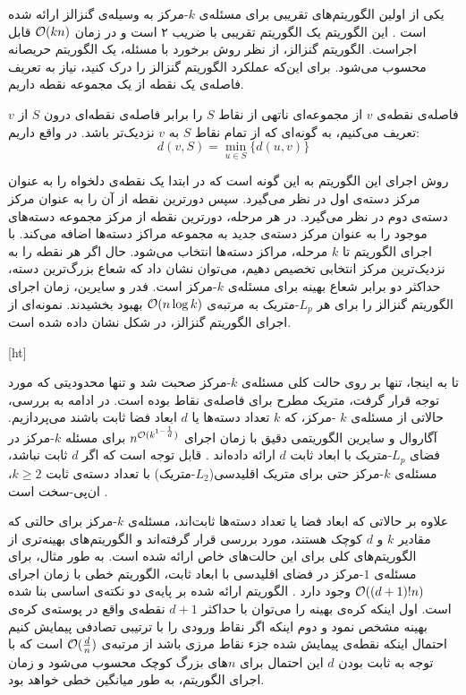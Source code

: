 یکی از اولین الگوریتم‌های تقریبی برای مسئله‌ی $k$-مرکز به وسیله‌ی گنزالز ارائه شده است . این الگوریتم یک الگوریتم تقریبی با ضریب ۲ است و در زمان $\mathcal{O}(kn)$ قابل اجراست. الگوریتم گنزالز، از نظر روش برخورد با مسئله، یک الگوریتم حریصانه محسوب می‌شود. برای این‌که عملکرد الگوریتم گنزالز را درک کنید، نیاز به تعریف فاصله‌ی یک نقطه از یک مجموعه نقطه داریم.

فاصله‌ی نقطه‌ی $v$ از‌ مجموعه‌ای‌ ناتهی از نقاط $S$ را برابر فاصله‌ی نقطه‌ای درون $S$ از $v$ تعریف می‌کنیم، به گونه‌ای که از تمام نقاط $S$ به $v$ نزدیک‌تر باشد. در واقع داریم:
$$d(v, S) = \min_{u \in S} \{ d(u, v) \}$$

 روش اجرای این الگوریتم به این گونه است که در ابتدا یک نقطه‌ی دلخواه را به عنوان مرکز‌ دسته‌ی اول در نظر می‌گیرد. سپس دورترین نقطه‌ از آن را به عنوان مرکز دسته‌ی دوم در نظر می‌گیرد. در هر مرحله، دورترین نقطه از مرکز ‌مجموعه دسته‌های موجود را به عنوان مرکز‌ دسته‌ی جدید به مجموعه مراکز‌ دسته‌ها اضافه می‌کند. با اجرای الگوریتم تا $k$ مرحله، مراکز دسته‌ها انتخاب می‌شود. حال اگر هر نقطه را به نزدیک‌ترین مرکز انتخابی تخصیص دهیم، می‌توان نشان داد که شعاع بزرگ‌ترین دسته، حداکثر دو برابر شعاع بهینه‌ برای مسئله‌ی $k$-مرکز است. فدر و سایرین، زمان اجرای الگوریتم گنزالز را برای هر $L_p$-متریک به مرتبه‌ی $\mathcal{O}(n \log{k})$ بهبود بخشیدند. نمونه‌ای از اجرای الگوریتم گنزالز، در شکل  نشان داده شده است.

[ht]

تا به اینجا، تنها بر روی حالت کلی مسئله‌ی $k$-مرکز صحبت شد و تنها محدودیتی که مورد توجه قرار گرفت، متریک مطرح برای فاصله‌ی نقاط بوده است. در ادامه به بررسی، حالاتی از مسئله‌ی $k$ -مرکز، که $k$ تعداد دسته‌ها یا $d$ ابعاد فضا ثابت باشند می‌پردازیم. آگاروال و سایرین الگوریتمی دقیق با زمان اجرای $n^{\mathcal{O}(k^{1 - \frac{1}{d}})}$ برای مسئله‌ $k$-مرکز در فضای $L_p$-متریک با ابعاد ثابت $d$ ارائه داده‌اند . قابل توجه است که اگر $d$ ثابت نباشد، مسئله‌ی $k$-مرکز حتی برای متریک اقلیدسی($L_2$-متریک) با تعداد دسته‌ی ثابت $k \geq 2$، ان‌پی-سخت است .

علاوه بر حالاتی که ابعاد فضا یا تعداد دسته‌ها ثابت‌اند، مسئله‌ی $k$-مرکز برای حالتی که مقادیر $k$ و $d$ کوچک هستند، مورد بررسی قرار گرفته‌اند و الگوریتم‌های بهینه‌تری از الگوریتم‌های کلی برای این حالت‌های خاص ارائه شده است. به طور مثال، برای مسئله‌ی $1$-مرکز در فضای اقلیدسی با ابعاد ثابت، الگوریتم خطی با زمان اجرای $\mathcal{O}((d+1)! n)$ وجود دارد . الگوریتم ارائه شده بر پایه‌ی دو نکته‌ی اساسی بنا شده است. اول اینکه کره‌ی بهینه را می‌توان با حداکثر $d+1$ نقطه‌ی واقع در پوسته‌ی کره‌ی بهینه مشخص نمود و دوم اینکه اگر نقاط ورودی را با ترتیبی تصادفی پیمایش‌ کنیم احتمال اینکه نقطه‌ی پیمایش شده جزء نقاط مرزی باشد از مرتبه‌ی $\mathcal{O}(\frac{d}{n})$ است که با توجه به ثابت بودن $d$ این احتمال برای $n$‌های بزرگ کوچک محسوب می‌شود و زمان اجرای الگوریتم، به طور میانگین خطی خواهد بود. 

